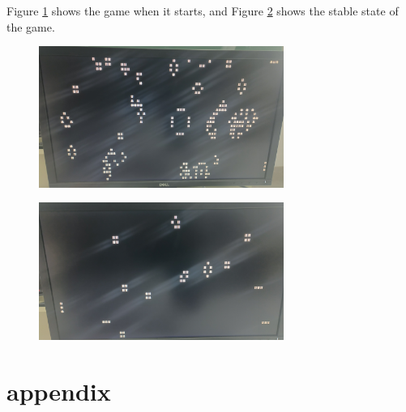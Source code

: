 \documentclass[
	a4paper, %
	11pt, %
]{CSUniSchoolLabReport}
\begin{document}
Figure \ref{fig:image12} shows the game when it starts, and Figure \ref{fig:image13} shows the stable state of the game.
\begin{figure}[!htb]
    \centering
    \includegraphics[width=8cm]{image12.png}
    \label{fig:image12}
\end{figure}

\begin{figure}[!htb]
    \centering
    \includegraphics[width=8cm]{image13.png}
    \label{fig:image13}
\end{figure}


\newpage
\newpage
\section{appendix}
\end{document}
